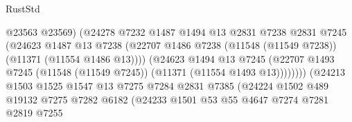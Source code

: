 \begin{lexlean}{RustStd}
\begin{coremodule}
                                          @23563
                                          @23569)
                                        (@24278
                                          @7232
                                          @1487
                                          @1494
                                          @13
                                          @2831
                                          @7238
                                          @2831
                                          @7245
                                          (@24623
                                            @1487
                                            @13
                                            @7238
                                            (@22707
                                              @1486
                                              @7238
                                              (@11548 (@11549 @7238))
                                              (@11371 (@11554 @1486 @13))))
                                          (@24623
                                            @1494
                                            @13
                                            @7245
                                            (@22707
                                              @1493
                                              @7245
                                              (@11548 (@11549 @7245))
                                              (@11371 (@11554 @1493 @13))))))))
                                  (@24213
                                    @1503
                                    @1525
                                    @1547
                                    @13
                                    @7275
                                    @7284
                                    @2831
                                    @7385
                                    (@24224
                                      @1502
                                      @489
                                      @19132
                                      @7275
                                      @7282
                                      @6182
                                      (@24233
                                        @1501
                                        @53
                                        @55
                                        @4647
                                        @7274
                                        @7281
                                        @2819
                                        @7255

\end{coremodule}
\end{lexlean}
